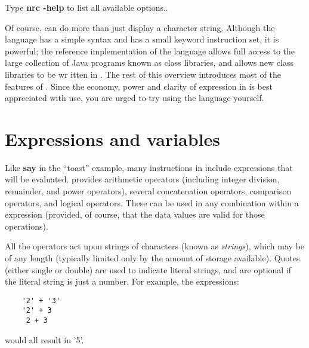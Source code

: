 Type \textbf{nrc -help} to list all available options..

Of course, \nr{} can do more than just display a character string. Although the language has a simple syntax and has
a small keyword instruction set, it is powerful; the reference implementation of the language allows full access
to the large collection of Java programs known as class libraries, and allows new class libraries to be wr
itten in \nr{}.
The rest of this overview introduces most of the features of \nr{}. Since the economy, power and clarity of expression
in \nr{} is best appreciated with use, you are urged to try using the language yourself.
\section{Expressions and variables}
Like \textbf{say} in the “toast” example, many instructions in \nr{} include expressions that will be evaluated. \nr{} provides arithmetic operators (including integer division, remainder, and power operators), several concatenation operators, comparison operators, and logical operators. These can be used in any combination within a \nr{} expression (provided, of course, that the data values are valid for those operations).

All the operators act upon strings of characters (known as \emph{\nr{}
strings}), which may be of any length (typically limited only by the
amount of storage available). Quotes (either single or double) are
used to indicate literal strings, and are optional if the literal
string is just a number. For example, the expressions:
\begin{lstlisting}
    '2' + '3'
    '2' + 3
     2 + 3
\end{lstlisting}
would all result in '5'.

